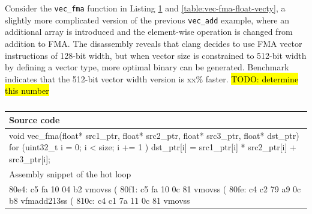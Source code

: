 \documentclass[logo,bsc,singlespacing,parskip]{infthesis}
\newenvironment{VerbatimCompact}
  {\vspace*{-2.5mm}\VerbatimEnvironment
   \par\Verbatim}
  {\endVerbatim\vspace*{-2.4mm}}
\begin{document}
Consider the \texttt{vec\_fma} function in Listing
\ref{table:vec-fma-float-auto} and \ref{table:vec-fma-float-vecty}, a slightly
more complicated version of the previous \texttt{vec\_add} example, where an
additional array is introduced and the element-wise operation is changed from
addition to FMA. The disassembly reveals that clang decides to use FMA vector
instructions of 128-bit width, but when vector size is constrained to 512-bit
width by defining a vector type, more optimal binary can be generated. Benchmark
indicates that the 512-bit vector width version is xx\% faster.  
\hl{TODO: determine this number}



\begin{table}[ht]\captionsetup{name=Listing}
\begin{tabular}{>{\raggedright\arraybackslash}p{14cm}}
    Source code\\
    \midrule
    \begin{VerbatimCompact}
void vec_fma(float* src1_ptr, float* src2_ptr,
             float* src3_ptr, float* dst_ptr) {
    for (uint32_t i = 0; i < size; i += 1 ){
        dst_ptr[i] = src1_ptr[i] * src2_ptr[i] + src3_ptr[i];
    }
}
    \end{VerbatimCompact}
    \\
    Assembly snippet of the hot loop\\
    \midrule
    \begin{VerbatimCompact}
80e4: c5 fa 10 04 b2     vmovss (%
80f1: c5 fa 10 0c 81     vmovss (%
80fe: c4 c2 79 a9 0c b8  vfmadd213ss (%
810c: c4 c1 7a 11 0c 81  vmovss %
    \end{VerbatimCompact}
    \\
\end{tabular}
\caption{}
\label{table:vec-fma-float-auto}
\end{table}
\end{document}
